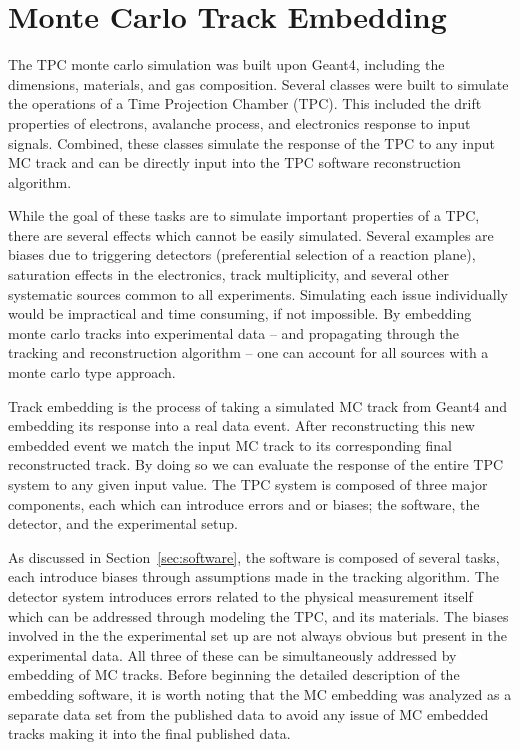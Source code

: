

\section{Monte Carlo Track Embedding}
 The TPC monte carlo simulation was built upon Geant4, including the dimensions, materials, and gas composition. Several classes were built to simulate the operations of a Time Projection Chamber (TPC). This included the drift properties of electrons, avalanche process, and electronics response to input signals. Combined, these classes simulate the response of the TPC to any input MC track and can be directly input into the \spirit TPC software reconstruction algorithm. 

While the goal of these tasks are to simulate important properties of a TPC, there are several effects which cannot be easily simulated. Several examples are biases due to triggering detectors (preferential selection of a reaction plane), saturation effects in the electronics, track multiplicity, and several other systematic sources common to all experiments. Simulating each issue individually would be impractical and time consuming, if not impossible. By embedding monte carlo tracks into experimental data -- and propagating through the tracking and reconstruction algorithm -- one can account for all sources with a monte carlo type approach.


Track embedding is the process of taking a simulated MC track from Geant4 and embedding its response into a real data event. After reconstructing this new embedded event we match the input MC track to its corresponding final reconstructed track.  By doing so we can evaluate the response of the entire TPC system to any given input value. The TPC system is composed of three major components, each which can introduce errors and or biases; the software, the detector, and the experimental setup.  

As discussed in Section~\ref{sec:software}, the software is composed of several tasks, each introduce biases through assumptions made in the tracking algorithm. The detector system introduces errors related to the physical measurement itself which can be addressed through modeling the TPC, and its materials. The biases involved in the the experimental set up are not always obvious but present in the experimental data. All three of these can be simultaneously addressed by embedding of MC tracks. Before beginning  the detailed description of the embedding software, it is worth noting that the MC embedding was analyzed as a separate data set from the published data to avoid any issue of MC embedded tracks making it into the final published data. 


